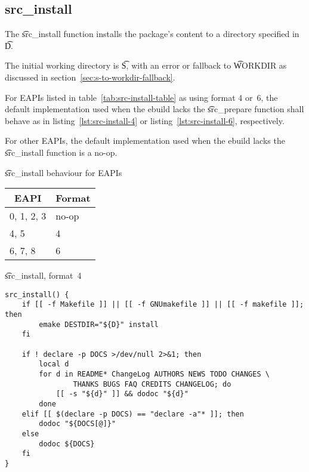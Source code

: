 \subsection{src_install}

 The \t{src_install} function installs the package's content to a
directory specified in \t{D}.

The initial working directory is \t{S}, with an error or fallback to \t{WORKDIR} as discussed in
section~\ref{sec:s-to-workdir-fallback}.

For EAPIs listed in table~\ref{tab:src-install-table} as using format 4 or~6, the default
implementation used when the ebuild lacks the \t{src_prepare} function shall behave as in
listing~\ref{lst:src-install-4} or listing~\ref{lst:src-install-6}, respectively.

For other EAPIs, the default implementation used when the ebuild lacks the \t{src_install} function
is a no-op.

\begin{centertable}{\t{src_install} behaviour for EAPIs}
    \label{tab:src-install-table}
    \begin{tabular}{ll}
      \toprule
      \multicolumn{1}{c}{\textbf{EAPI}} &
      \multicolumn{1}{c}{\textbf{Format}} \\
      \midrule
      0, 1, 2, 3        & no-op \\
      4, 5              & 4     \\
      6, 7, 8           & 6     \\
      \bottomrule
    \end{tabular}
\end{centertable}

\begin{listing}[H]
\caption{\t{src_install}, format~4} \label{lst:src-install-4}
\begin{verbatim}
src_install() {
    if [[ -f Makefile ]] || [[ -f GNUmakefile ]] || [[ -f makefile ]]; then
        emake DESTDIR="${D}" install
    fi

    if ! declare -p DOCS >/dev/null 2>&1; then
        local d
        for d in README* ChangeLog AUTHORS NEWS TODO CHANGES \
                THANKS BUGS FAQ CREDITS CHANGELOG; do
            [[ -s "${d}" ]] && dodoc "${d}"
        done
    elif [[ $(declare -p DOCS) == "declare -a"* ]]; then
        dodoc "${DOCS[@]}"
    else
        dodoc ${DOCS}
    fi
}
\end{verbatim}
\end{listing}

